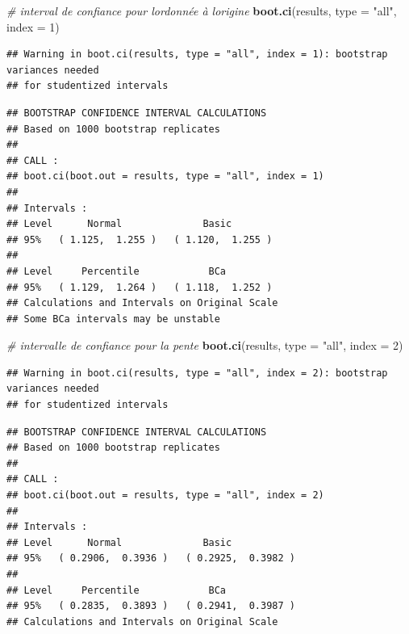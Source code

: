 \documentclass[
  12pt,
]{book}
\newenvironment{Shaded}{\begin{snugshade}}{\end{snugshade}}
\newcommand{\CommentTok}[1]{\textcolor[rgb]{0.56,0.35,0.01}{\textit{#1}}}
\newcommand{\DataTypeTok}[1]{\textcolor[rgb]{0.13,0.29,0.53}{#1}}
\newcommand{\DecValTok}[1]{\textcolor[rgb]{0.00,0.00,0.81}{#1}}
\newcommand{\KeywordTok}[1]{\textcolor[rgb]{0.13,0.29,0.53}{\textbf{#1}}}
\newcommand{\NormalTok}[1]{#1}
\newcommand{\StringTok}[1]{\textcolor[rgb]{0.31,0.60,0.02}{#1}}
\begin{document}
\begin{Shaded}
\begin{Highlighting}[]
\CommentTok{\# interval de confiance pour l\textquotesingle{}ordonnée à l\textquotesingle{}origine}
\KeywordTok{boot.ci}\NormalTok{(results, }\DataTypeTok{type =} \StringTok{"all"}\NormalTok{, }\DataTypeTok{index =} \DecValTok{1}\NormalTok{)}
\end{Highlighting}
\end{Shaded}

\begin{verbatim}
## Warning in boot.ci(results, type = "all", index = 1): bootstrap variances needed
## for studentized intervals
\end{verbatim}

\begin{verbatim}
## BOOTSTRAP CONFIDENCE INTERVAL CALCULATIONS
## Based on 1000 bootstrap replicates
## 
## CALL : 
## boot.ci(boot.out = results, type = "all", index = 1)
## 
## Intervals : 
## Level      Normal              Basic         
## 95%   ( 1.125,  1.255 )   ( 1.120,  1.255 )  
## 
## Level     Percentile            BCa          
## 95%   ( 1.129,  1.264 )   ( 1.118,  1.252 )  
## Calculations and Intervals on Original Scale
## Some BCa intervals may be unstable
\end{verbatim}

\begin{Shaded}
\begin{Highlighting}[]
\CommentTok{\# intervalle de confiance pour la pente}
\KeywordTok{boot.ci}\NormalTok{(results, }\DataTypeTok{type =} \StringTok{"all"}\NormalTok{, }\DataTypeTok{index =} \DecValTok{2}\NormalTok{)}
\end{Highlighting}
\end{Shaded}

\begin{verbatim}
## Warning in boot.ci(results, type = "all", index = 2): bootstrap variances needed
## for studentized intervals
\end{verbatim}

\begin{verbatim}
## BOOTSTRAP CONFIDENCE INTERVAL CALCULATIONS
## Based on 1000 bootstrap replicates
## 
## CALL : 
## boot.ci(boot.out = results, type = "all", index = 2)
## 
## Intervals : 
## Level      Normal              Basic         
## 95%   ( 0.2906,  0.3936 )   ( 0.2925,  0.3982 )  
## 
## Level     Percentile            BCa          
## 95%   ( 0.2835,  0.3893 )   ( 0.2941,  0.3987 )  
## Calculations and Intervals on Original Scale
\end{verbatim}
\end{document}
